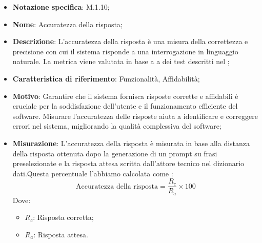 \begin{itemize}
    \item \textbf{Notazione specifica}: M.1.10;
    \item \textbf{Nome}: Accuratezza della risposta;
    \item \textbf{Descrizione}: L'accuratezza della risposta è una misura della correttezza e precisione con cui il sistema risponde a una interrogazione in linguaggio naturale. La metrica viene valutata in base a a dei test descritti nel ;
    \item \textbf{Caratteristica di riferimento}: Funzionalità, Affidabilità;
    \item \textbf{Motivo}: Garantire che il sistema fornisca risposte corrette e affidabili è cruciale per la soddisfazione dell'utente e il funzionamento efficiente del software. Misurare l'accuratezza delle risposte aiuta a identificare e correggere errori nel sistema, migliorando la qualità complessiva del software;
    \item \textbf{Misurazione}: L'accuratezza della risposta è misurata in base alla distanza della risposta ottenuta dopo la generazione di un prompt su frasi preselezionate e la risposta attesa scritta dall'attore tecnico nel dizionario dati.Questa percentuale l'abbiamo calcolata come :
    \[
    \text{Accuratezza della risposta} = \frac{R_{c}}{R_{a}} \times 100
    \]
    Dove:
    \begin{itemize}
        \item $R_{c}$: Risposta corretta;
        \item $R_{a}$: Risposta attesa.
    \end{itemize}
 \end{itemize}
